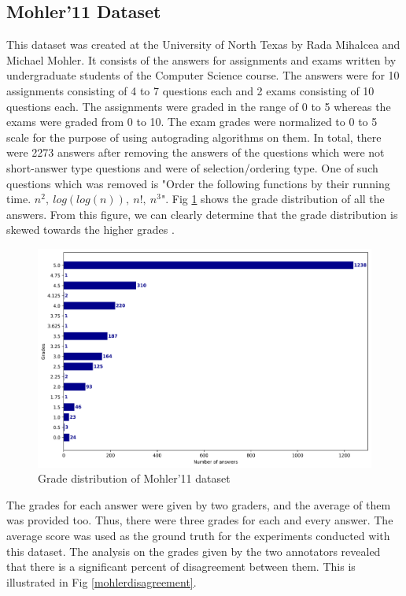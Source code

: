     \subsection{Mohler'11 Dataset}
    
    This dataset was created at the University of North Texas by Rada Mihalcea and Michael Mohler. It consists of the answers for assignments and exams written by undergraduate students of the Computer Science course. The answers were for 10 assignments consisting of 4 to 7 questions each and 2 exams consisting of 10 questions each. The assignments were graded in the range of 0 to 5 whereas the exams were graded from 0 to 10. The exam grades were normalized to 0 to 5 scale for the purpose of using autograding algorithms on them. In total, there were 2273 answers after removing the answers of the questions which were not short-answer type questions and were of selection/ordering type. One of such questions which was removed is "Order the following functions by their running time. $ n^2,  ~log(log(n)), ~n!, ~n^3$". Fig \ref{mohlergrades} shows the grade distribution of all the answers. From this figure, we can clearly determine that the grade distribution is skewed towards the higher grades \cite{Mohler2011}. 
    
    \begin{figure}[h]
    	\centering
    	\includegraphics[scale=0.4]{images/mohlergrades}
    	\caption{Grade distribution of Mohler'11 dataset}
	    \label{mohlergrades}
	\end{figure}

	The grades for each answer were given by two graders, and the average of them was provided too. Thus, there were three grades for each and every answer. The average score was used as the ground truth for the experiments conducted with this dataset. The analysis on the grades given by the two annotators revealed that there is a significant percent of disagreement between them. This is illustrated in Fig \ref{mohlerdisagreement}.      

